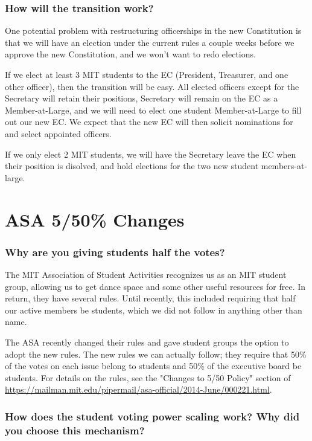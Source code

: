 \documentclass{article}
\begin{document}
\subsubsection*{How will the transition work?}
One potential problem with restructuring officerships in the new Constitution is that we will have an election under the current rules a couple weeks before we approve the new Constitution, and we won't want to redo elections.

If we elect at least 3 MIT students to the EC (President, Treasurer, and one other officer), then the transition will be easy. All elected officers except for the Secretary will retain their positions, Secretary will remain on the EC as a Member-at-Large, and we will need to elect one student Member-at-Large to fill out our new EC. We expect that the new EC will then solicit nominations for and select appointed officers.

If we only elect 2 MIT students, we will have the Secretary leave the EC when their position is disolved, and hold elections for the two new student members-at-large.


\section{ASA 5/50\% Changes}

\subsubsection*{Why are you giving students half the votes?}
The MIT Association of Student Activities recognizes us as an MIT student group, allowing us to get dance space and some other useful resources for free. In return, they have several rules. Until recently, this included requiring that half our active members be students, which we did not follow in anything other than name.

The ASA recently changed their rules and gave student groups the option to adopt the new rules. The new rules we can actually follow; they require that 50\% of the votes on each issue belong to students and 50\% of the executive board be students. For details on the rules, see the "Changes to 5/50 Policy" section of \url{https://mailman.mit.edu/pipermail/asa-official/2014-June/000221.html}.

\subsubsection*{How does the student voting power scaling work? Why did you choose this mechanism?}
\end{document}
